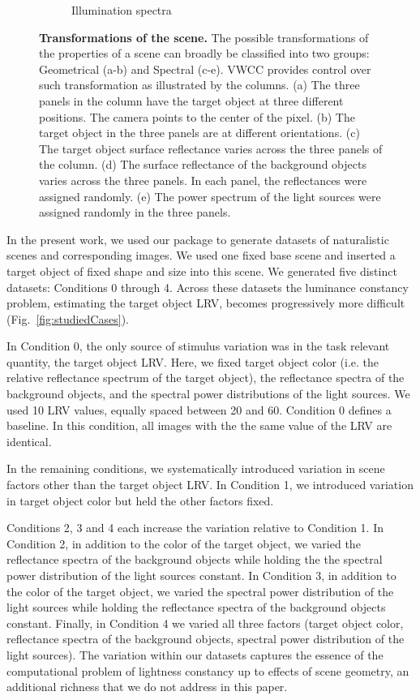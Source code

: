 \documentclass{jov}
\begin{document}
\begin{figure}
\begin{subfigure}[b]{0.18 \textwidth}
        \caption{Illumination spectra}
        \label{fig:illuminationVariation}
    \end{subfigure}
    \caption{{\bf Transformations of the scene.} The possible transformations of the properties of a scene can broadly be classified into two groups: Geometrical (a-b) and Spectral (c-e). VWCC provides control over such transformation as illustrated by the columns. (a) The three panels in the column have the target object at three different positions. The camera points to the center of the pixel. (b) The target object in the three panels are at different orientations. (c) The target object surface reflectance varies across the three panels of the column. (d) The surface reflectance of the background objects varies across the three panels. In each panel, the reflectances were assigned randomly. (e) The power spectrum of the light sources were assigned randomly in the three panels. 
\label{fig:VWCCTransformations}}
\end{figure}

In the present work, we used our package to generate datasets of naturalistic scenes and corresponding images.
We used one fixed base scene and inserted a target object of fixed shape and size into this scene.
We generated five distinct datasets: Conditions 0 through 4.
Across these datasets the luminance constancy problem, estimating the target object LRV,
becomes progressively more difficult (Fig.~\ref{fig:studiedCases}).

In Condition 0, the only source of stimulus variation was in the task relevant quantity, the target object LRV.
Here, we fixed target object color (i.e. the relative reflectance spectrum of the target object),
the reflectance spectra of the background objects, and the spectral power distributions of the light sources.
We used 10 LRV values, equally spaced between 20 and 60.
Condition 0 defines a baseline. In this condition, all images with the the same value of the LRV are identical.

In the remaining conditions, we systematically introduced variation in scene factors other than the target object LRV.
In Condition 1, we introduced variation in target object color but held the other factors fixed.

Conditions 2, 3 and 4 each increase the variation relative to Condition 1.
In Condition 2, in addition to the color of the target object,
we varied the reflectance spectra of the background objects
while holding the the spectral power distribution of the light sources
constant.
In Condition 3, in addition to the color of the target object,
we varied the spectral power distribution of the light sources
while holding the reflectance spectra of the background objects constant.
Finally, in Condition 4 we varied all three factors (target object color,
reflectance spectra of the background objects, spectral power distribution of the light sources).
The variation within our datasets captures the essence of the computational problem of lightness constancy
up to effects of scene geometry, an additional richness that we do not address in this paper.
\end{document}

